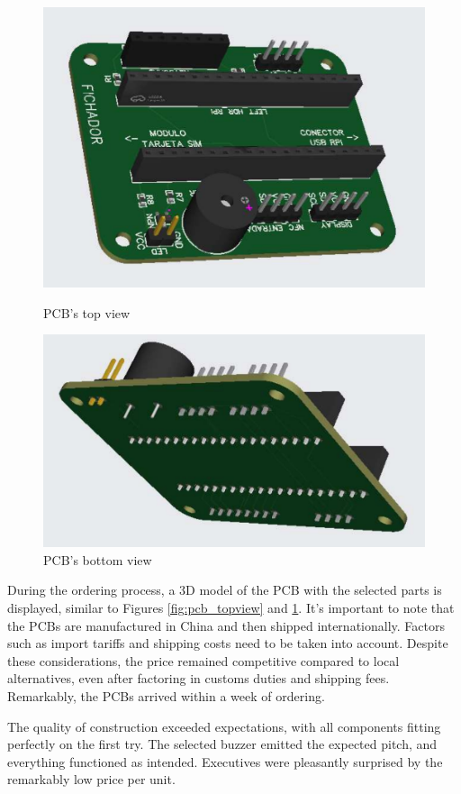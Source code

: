 \begin{figure}[h]
    \centering
    \begin{minipage}[b]{0.45\textwidth}
        \centering
        \includegraphics[width=.9\textwidth]{Imagenes/Vectorial/pcb1.pdf}
        \caption{PCB's top view}
        \label{fig:pcb_topview}
    \end{minipage}
    \hfill
    \begin{minipage}[b]{0.45\textwidth}
        \centering
        \includegraphics[width=.9\textwidth]{Imagenes/Vectorial/pcb2.pdf}
        \caption{PCB's bottom view}
        \label{fig:pcb_bottomview}
    \end{minipage}
\end{figure}

During the ordering process, a 3D model of the PCB with the selected parts is displayed, similar to Figures 
\ref{fig:pcb_topview} and \ref{fig:pcb_bottomview}. It's important to note that the PCBs are manufactured in 
China and then shipped internationally. Factors such as import tariffs and shipping costs need to be taken 
into account. Despite these considerations, the price remained competitive compared to local alternatives, 
even after factoring in customs duties and shipping fees. Remarkably, the PCBs arrived within a week of 
ordering.

The quality of construction exceeded expectations, with all components fitting perfectly on the first try. 
The selected buzzer emitted the expected pitch, and everything functioned as intended. Executives were 
pleasantly surprised by the remarkably low price per unit.
